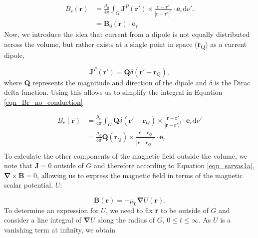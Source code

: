 \begin{equation}
	\begin{aligned}
		B_r(\mathbf{r}) &= \frac{\mu_0}{4\pi}\int_{G}\mathbf{J}^P(\mathbf{r}')\times\frac{\mathbf{r}-\mathbf{r}'}{|\mathbf{r}-\mathbf{r}'|^3}\cdot\mathbf{e}_r\text{d}\nu'. \\
		&= \mathbf{B}_0(\mathbf{r})\cdot\mathbf{e}_r
		\label{eqn_Br_no_conduction}
	 \end{aligned}
\end{equation} Now, we introduce the idea that current from a dipole is not equally distributed across the volume, but rather exists at a single point in space (\textbf{r}\textsubscript{Q}) as a current dipole, 

\begin{equation}
\mathbf{J}^P(\mathbf{r}') = \mathbf{Q}\delta(\mathbf{r}'-\mathbf{r}_Q),
\end{equation} where \textbf{Q} represents the magnitude and direction of the dipole and $\delta$ is the Dirac delta function. Using this allows us to simplify the integral in Equation \ref{eqn_Br_no_conduction}

\begin{equation}
\begin{aligned}
B_r(\mathbf{r}) &= \frac{\mu_0}{4\pi}\int_{G}\mathbf{Q}\delta(\mathbf{r}'-\mathbf{r}_Q)\times\frac{\mathbf{r}-\mathbf{r}'}{|\mathbf{r}-\mathbf{r}'|^3}\cdot\mathbf{e}_r\text{d}\nu' \\
&= \frac{\mu_0}{4\pi} \mathbf{Q}(\mathbf{r}_Q)\times\frac{\mathbf{r}-\mathbf{r}_Q}{|\mathbf{r}-\mathbf{r}_Q|^3}\cdot\mathbf{e}_r \\
\end{aligned}
\end{equation} To calculate the other components of the magnetic field outside the volume, we note that $\mathbf{J}=0$ outside of $G$ and therefore according to Equation \ref{eqn_sarvas1a}, $\mathbf{\nabla}\times\mathbf{B} = 0$, allowing us to express the magnetic field in terms of the magnetic scalar potential, $U$:

\begin{equation}
	\mathbf{B}(\mathbf{r}) = -\mu_0\mathbf{\nabla}U(\mathbf{r}). \label{eqn_pot_formula}
\end{equation} To determine an expression for $U$, we need to fix \textbf{r} to be outside of $G$ and consider a line integral of $\mathbf{\nabla}U$ along the radius of $G$, $0 \leq t \leq \infty$. As $U$ is a vanishing term at infinity, we obtain

